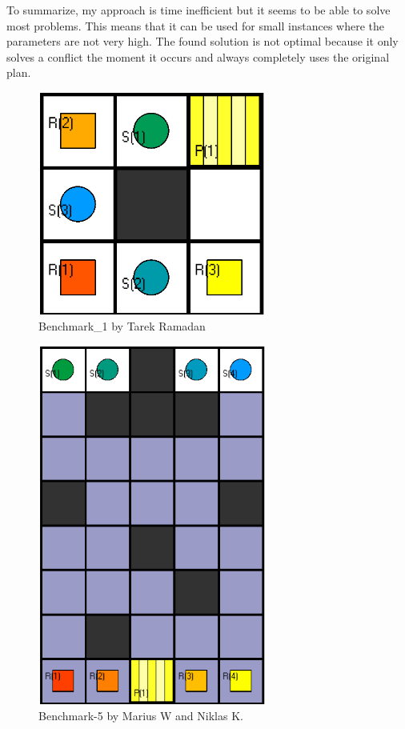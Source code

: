 \documentclass[runningheads]{llncs}
\begin{document}
To summarize, my approach is time inefficient but it seems to be able to solve most problems. This means that it can be used for small instances where the parameters are not very high. The found solution is not optimal because it only solves a conflict the moment it occurs and always completely uses the original plan.       

\begin{figure}[h]
\includegraphics[width=75mm]{Images/Instance 1}
\caption{Benchmark\_1 by Tarek Ramadan}
\label{fig:I1}
\end{figure}

\begin{figure}[h]
\includegraphics[width=75mm]{Images/Instance 2}
\caption{Benchmark-5 by Marius W and Niklas K.}
\label{fig:I2}
\end{figure}
\end{document}
